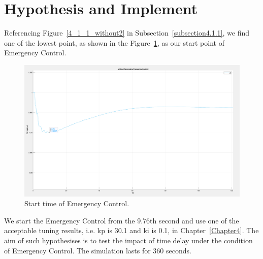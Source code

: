 \section{Hypothesis and Implement} %
Referencing Figure~\ref{4_1_1_without2} in Subsection~\ref{subsection4.1.1}, we find one of the lowest point, as shown in the Figure~\ref{6_2_g9}, as our start point of Emergency Control. \\

\begin{figure}[htbp]
\centering
\includegraphics[width = .819\textwidth]{figure/6_2_g9.png}
\caption{Start time of Emergency Control.}
\label{6_2_g9}
\end{figure}

We start the Emergency Control from the 9.76th second and use one of the acceptable tuning results, i.e. kp is 30.1 and ki is 0.1, in Chapter~\ref{Chapter4}. The aim of such hypothesises is to test the impact of time delay under the condition of Emergency Control. The simulation lasts for 360 seconds.\\